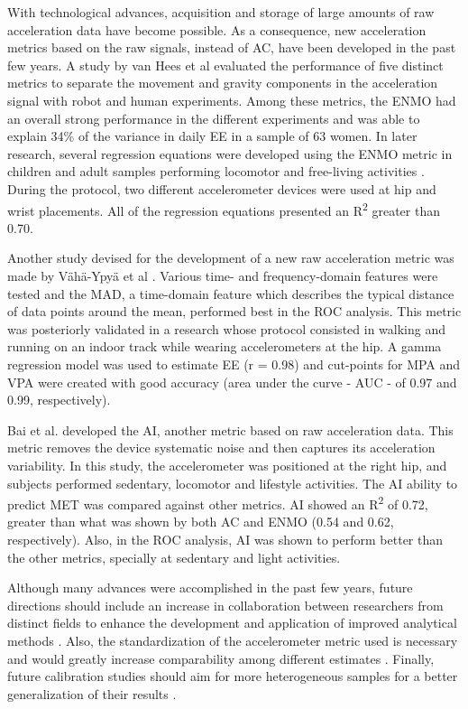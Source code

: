\documentclass[12pt]{article}
\begin{document}
With technological advances, acquisition and storage of large amounts of raw acceleration data have become possible. As a consequence, new acceleration metrics based on the raw signals, instead of AC, have been developed in the past few years. A study by van Hees et al  evaluated the performance of five distinct metrics to separate the movement and gravity components in the acceleration signal with robot and human experiments. Among these metrics, the ENMO had an overall strong performance in the different experiments and was able to explain 34\% of the variance in daily EE in a sample of 63 women. In later research, several regression equations were developed using the ENMO metric in children and adult samples performing locomotor and free-living activities . During the protocol, two different accelerometer devices were used at hip and wrist placements. All of the regression equations presented an R\textsuperscript{2} greater than 0.70.

Another study devised for the development of a new raw acceleration metric was made by V{\"a}h{\"a}-Ypy{\"a} et al . Various time- and frequency-domain features were tested and the MAD, a time-domain feature which describes the typical distance of data points around the mean, performed best in the ROC analysis. This metric was posteriorly validated in a research  whose protocol consisted in walking and running on an indoor track while wearing accelerometers at the hip. A gamma regression model was used to estimate EE (r = 0.98) and cut-points for MPA and VPA were created with good accuracy (area under the curve - AUC - of 0.97 and 0.99, respectively).

Bai et al.  developed the AI, another metric based on raw acceleration data. This metric removes the device systematic noise and then captures its acceleration variability. In this study, the accelerometer was positioned at the right hip, and subjects performed sedentary, locomotor and lifestyle activities. The AI ability to predict MET was compared against other metrics. AI showed an R\textsuperscript{2} of 0.72, greater than what was shown by both AC and ENMO (0.54 and 0.62, respectively). Also, in the ROC analysis, AI was shown to perform better than the other metrics, specially at sedentary and light activities. 

Although many advances were accomplished in the past few years, future directions should include an increase in collaboration between researchers from distinct fields to enhance the development and application of improved analytical methods . Also, the standardization of the accelerometer metric used is necessary and would greatly increase comparability among different estimates . Finally, future calibration studies should aim for more heterogeneous samples for a better generalization of their results .
\end{document}
